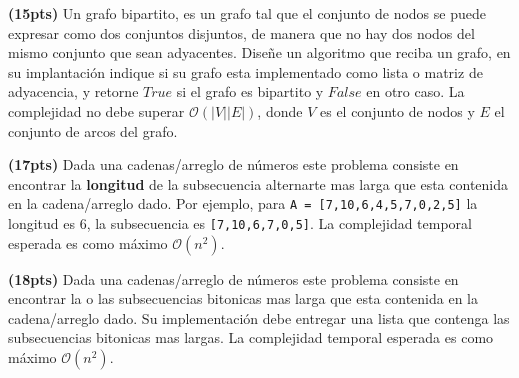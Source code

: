 \documentclass[12pt, a4paper]{exam}
\begin{document}
\begin{questions}
	\pointsdroppedatright
	
	\question \textbf{(15pts)} Un grafo bipartito, es un grafo tal que el conjunto de nodos se puede expresar como dos conjuntos disjuntos, de manera que no hay dos nodos del mismo conjunto que sean adyacentes. Diseñe un algoritmo que reciba un grafo, en su implantación indique si su grafo esta implementado como lista o matriz de adyacencia, y retorne $True$ si el grafo es bipartito y $False$ en otro caso. La complejidad no debe superar $\mathcal{O}(|V||E|)$, donde $V$ es el conjunto de nodos y $E$ el conjunto de arcos del grafo. 

	
	\question \textbf{(17pts)} Dada una cadenas/arreglo de números este problema consiste en encontrar la \textbf{longitud} de la subsecuencia alternarte mas larga que esta contenida en la cadena/arreglo dado. Por ejemplo, para \texttt{A = [7,10,6,4,5,7,0,2,5]} la longitud es 6,  la subsecuencia es \texttt{[7,10,6,7,0,5]}. La complejidad temporal esperada es como máximo $\mathcal{O}(n^2)$.
	
	
	\question  \textbf{(18pts)}  Dada una cadenas/arreglo de números este problema consiste en encontrar la o las subsecuencias bitonicas mas larga que esta contenida en la cadena/arreglo dado. Su implementación debe entregar una lista que contenga las subsecuencias bitonicas mas largas. La complejidad temporal esperada es como máximo $\mathcal{O}(n^2)$.
	\begin{parts}

\end{parts}
\end{questions}
\end{document}
